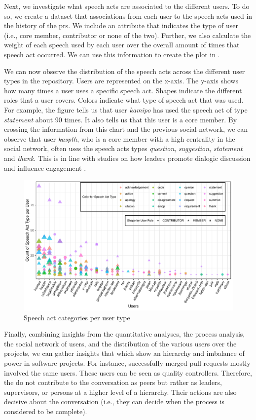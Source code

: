 Next, we investigate what speech acts are associated to the different users. To do so, we create a dataset that associations from each user to the speech acts used in the history of the \glspl{pr}. We include an attribute that indicates the type of user (i.e., core member, contributor or none of the two). Further, we also calculate the weight of each speech used by each user over the overall amount of times that speech act occurred. We can use this information to create the plot in .

We can now observe the distribution of the speech acts across the different user types in the repository. Users are represented on the x-axis. The y-axis shows how  many  times  a  user  uses  a  specific  speech act. Shapes indicate the different roles that a user covers. Colors indicate what type of speech act that was used. For example, the figure tells us that user \emph{kamipo} has used the speech act of type \emph{statement} about 90 times. It also tells us that this user is a core member. By crossing the information from this chart and the previous social-network, we can observe that user \emph{kaspth}, who is a core member with a high centrality in the social network, often uses the speech acts types \emph{question}, \emph{suggestion}, \emph{statement} and \emph{thank}. This is in line with studies on how leaders promote dialogic discussion \citep{lemmetty2020moment} and influence engagement \citep{rabiul2021leadership}. 

\begin{figure}
	\centering
	\includegraphics[width=\linewidth]{figures/speechActTypesPerUser}
	\caption{Speech act categories per user type}
	\label{fig:speech-act-types-per-user}
\end{figure}


Finally, combining insights from the quantitative analyses, the process analysis, the social network of users, and the distribution of the various users over the projects, we can gather insights that which show an hierarchy and imbalance of power in software projects. For instance, successfully merged pull requests mostly involved the same users. These users can be seen as quality controllers. Therefore, the do not contribute to the conversation as peers but rather as leaders, supervisors, or persons at a higher level of a hierarchy. Their actions are also decisive about the conversation (i.e., they can decide when the process is considered to be complete). 
